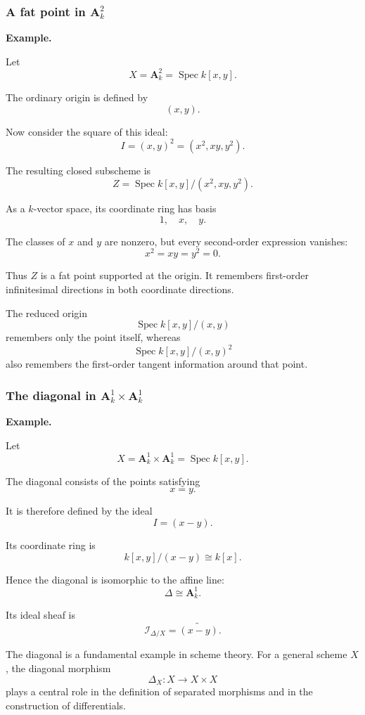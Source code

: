 \documentclass[12pt,a4paper]{article}
\theoremstyle{notespace}
\begin{document}
\subsubsection{A fat point in \(\mathbf A^2_k\)}

\textbf{Example.}

Let
\[
X=\mathbf A^2_k=\operatorname{Spec}k[x,y].
\]

The ordinary origin is defined by
\[
(x,y).
\]

Now consider the square of this ideal:
\[
I=(x,y)^2=(x^2,xy,y^2).
\]

The resulting closed subscheme is
\[
Z=\operatorname{Spec}
k[x,y]/(x^2,xy,y^2).
\]

As a \(k\)-vector space, its coordinate ring has basis
\[
1,\quad x,\quad y.
\]

The classes of \(x\) and \(y\) are nonzero, but every second-order expression vanishes:
\[
x^2=xy=y^2=0.
\]

Thus \(Z\) is a fat point supported at the origin. It remembers first-order infinitesimal directions in both coordinate directions.

The reduced origin
\[
\operatorname{Spec}k[x,y]/(x,y)
\]
remembers only the point itself, whereas
\[
\operatorname{Spec}k[x,y]/(x,y)^2
\]
also remembers the first-order tangent information around that point.

\subsubsection{The diagonal in \(\mathbf A^1_k\times\mathbf A^1_k\)}

\textbf{Example.}

Let
\[
X=\mathbf A^1_k\times\mathbf A^1_k
=
\operatorname{Spec}k[x,y].
\]

The diagonal consists of the points satisfying
\[
x=y.
\]

It is therefore defined by the ideal
\[
I=(x-y).
\]

Its coordinate ring is
\[
k[x,y]/(x-y)\cong k[x].
\]

Hence the diagonal is isomorphic to the affine line:
\[
\Delta\cong\mathbf A^1_k.
\]

Its ideal sheaf is
\[
\mathcal I_{\Delta/X}
=
\widetilde{(x-y)}.
\]

The diagonal is a fundamental example in scheme theory. For a general scheme \(X\), the diagonal morphism
\[
\Delta_X:X\longrightarrow X\times X
\]
plays a central role in the definition of separated morphisms and in the construction of differentials.
\end{document}
